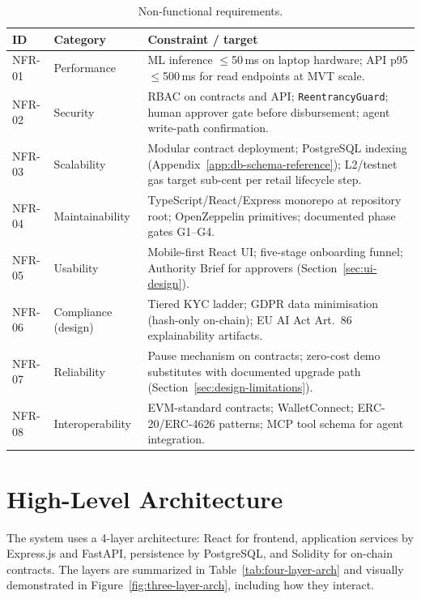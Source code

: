 \documentclass[12pt,a4paper]{report}
\newcommand{\tableheadcolor}{\rowcolor{TableHeadBg}}
\begin{document}
\begin{table}[H]
\centering
\caption[Non-functional requirements]{Non-functional requirements.}
\label{tab:nonfunctional-requirements}
\small
\begin{tabular}{@{}p{1.2cm}p{2.4cm}p{10.6cm}@{}}
\toprule
\tableheadcolor
\textbf{ID} & \textbf{Category} & \textbf{Constraint / target} \\
\midrule
NFR-01 & Performance & ML inference $\leq$50\,ms on laptop hardware; API p95 $\leq$500\,ms for read endpoints at MVT scale. \\
NFR-02 & Security & RBAC on contracts and API; \texttt{ReentrancyGuard}; human approver gate before disbursement; agent write-path confirmation. \\
NFR-03 & Scalability & Modular contract deployment; PostgreSQL indexing (Appendix~\ref{app:db-schema-reference}); L2/testnet gas target sub-cent per retail lifecycle step. \\
NFR-04 & Maintainability & TypeScript/React/Express monorepo at repository root; OpenZeppelin primitives; documented phase gates G1--G4. \\
NFR-05 & Usability & Mobile-first React UI; five-stage onboarding funnel; Authority Brief for approvers (Section~\ref{sec:ui-design}). \\
NFR-06 & Compliance (design) & Tiered KYC ladder; GDPR data minimisation (hash-only on-chain); EU AI Act Art.~86 explainability artifacts. \\
NFR-07 & Reliability & Pause mechanism on contracts; zero-cost demo substitutes with documented upgrade path (Section~\ref{sec:design-limitations}). \\
NFR-08 & Interoperability & EVM-standard contracts; WalletConnect; ERC-20/ERC-4626 patterns; MCP tool schema for agent integration. \\
\bottomrule
\end{tabular}
\end{table}

\section{High-Level Architecture}
\label{sec:high-level-arch}

The system uses a 4-layer architecture: React for frontend, application services by Express.js and FastAPI, persistence by PostgreSQL, and Solidity for on-chain contracts. The layers are summarized in Table~\ref{tab:four-layer-arch} and visually demonstrated in Figure~\ref{fig:three-layer-arch}, including how they interact.
\end{document}
